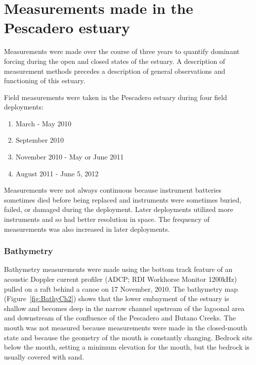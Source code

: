 \section{Measurements made in the Pescadero estuary} \label{measurementslabel}

Measurements were made over the course of three years to quantify dominant forcing during the open and closed states of the estuary. A description of measurement methods precedes a description of general observations and functioning of this estuary.

Field measurements were taken in the Pescadero estuary during four field deployments:

\begin{enumerate}
	\item March - May 2010 
	\item September 2010 
	\item November 2010 - May or June 2011 
	\item August 2011 - June 5, 2012
\end{enumerate}

 Measurements were not always continuous because instrument batteries sometimes died before being replaced and instruments were sometimes buried, failed, or damaged during the deployment. Later deployments utilized more instruments and so had better resolution in space.  The frequency of measurements was also increased in later deployments. 

\subsubsection{Bathymetry} \label{sssec:bathymetry}
Bathymetry measurements were made using the bottom track feature of an acoustic Doppler current profiler (ADCP; RDI Workhorse Monitor 1200kHz) pulled on a raft behind a canoe on 17 November, 2010. The bathymetry map (Figure~\ref{fig:BathyCh2}) shows that the lower embayment of the estuary is shallow and becomes deep in the narrow channel upstream of the lagoonal area and downstream of the confluence of the Pescadero and Butano Creeks. The mouth was not measured because measurements were made in the closed-mouth state and because the geometry of the mouth is constantly changing. Bedrock sits below the mouth, setting a minimum elevation for the mouth, but the bedrock is usually covered with sand. 

